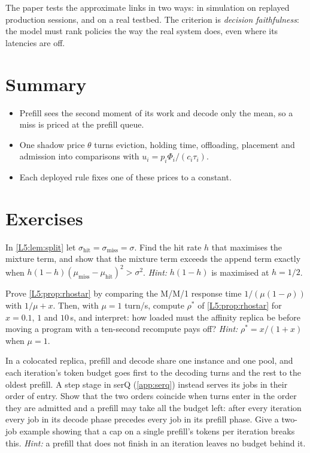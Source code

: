 The paper tests the approximate links in two ways: in simulation on
replayed production sessions, and on a real testbed. The criterion is
\emph{decision faithfulness}: the model must rank policies the way the
real system does, even where its latencies are off.

\section{Summary}
\begin{itemize}
\item Prefill sees the second moment of its work and decode only the mean, so a miss is priced at the prefill queue.
\item One shadow price $\theta$ turns eviction, holding time, offloading, placement and admission into comparisons with $u_i=p_i\Phi_i/(c_i\tau_i)$.
\item Each deployed rule fixes one of these prices to a constant.
\end{itemize}

\section{Exercises}

\begin{exercise}\label{L5:ex:split}
In \cref{L5:lem:split} let $\sigma_{\mathrm{hit}}=\sigma_{\mathrm{miss}}=\sigma$.
Find the hit rate $h$ that maximises the mixture term, and show that the
mixture term exceeds the append term exactly when
$h(1-h)(\mu_{\mathrm{miss}}-\mu_{\mathrm{hit}})^2>\sigma^2$.
\emph{Hint:} $h(1-h)$ is maximised at $h=1/2$.
\end{exercise}

\begin{exercise}\label{L5:ex:rhostar}
Prove \cref{L5:prop:rhostar} by comparing the M/M/1 response time $1/(\mu(1-\rho))$
with $1/\mu+x$. Then, with $\mu=1$ turn/s, compute $\rho^*$ of \cref{L5:prop:rhostar} for
$x=0.1$, $1$ and $10$\,s, and interpret: how loaded must the affinity
replica be before moving a program with a ten-second recompute pays off?
\emph{Hint:} $\rho^*=x/(1+x)$ when $\mu=1$.
\end{exercise}

\begin{exercise}\label{L5:ex:colocated}
In a colocated replica, prefill and decode share one instance and one pool, and each
iteration's token budget goes first to the decoding turns and the rest to the oldest
prefill. A step stage in serQ (\cref{app:serq}) instead serves its jobs in their order
of entry. Show that the two orders coincide when turns enter in the order they are
admitted and a prefill may take all the budget left: after every iteration every job in
its decode phase precedes every job in its prefill phase. Give a two-job example
showing that a cap on a single prefill's tokens per iteration breaks this.
\emph{Hint:} a prefill that does not finish in an iteration leaves no budget behind it.
\end{exercise}
